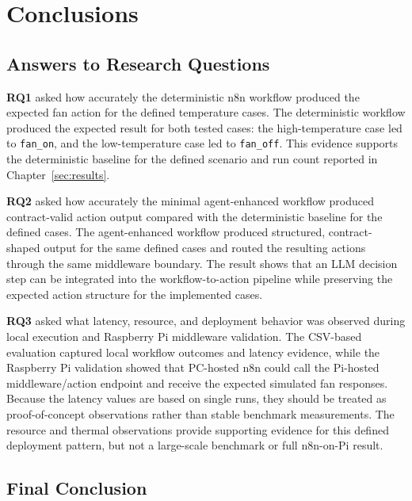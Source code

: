 \section{Conclusions}\label{sec:conclusions}

\subsection{Answers to Research Questions}\label{subsec:conclusion-research-questions}

\textbf{RQ1} asked how accurately the deterministic n8n workflow produced the expected fan action for the defined temperature cases. The deterministic workflow produced the expected result for both tested cases: the high-temperature case led to \texttt{fan\_on}, and the low-temperature case led to \texttt{fan\_off}. This evidence supports the deterministic baseline for the defined scenario and run count reported in Chapter~\ref{sec:results}.

\textbf{RQ2} asked how accurately the minimal agent-enhanced workflow produced contract-valid action output compared with the deterministic baseline for the defined cases. The agent-enhanced workflow produced structured, contract-shaped output for the same defined cases and routed the resulting actions through the same middleware boundary. The result shows that an LLM decision step can be integrated into the workflow-to-action pipeline while preserving the expected action structure for the implemented cases.


\textbf{RQ3} asked what latency, resource, and deployment behavior was observed during local execution and Raspberry Pi middleware validation. The CSV-based evaluation captured local workflow outcomes and latency evidence, while the Raspberry Pi validation showed that PC-hosted n8n could call the Pi-hosted middleware/action endpoint and receive the expected simulated fan responses. Because the latency values are based on single runs, they should be treated as proof-of-concept observations rather than stable benchmark measurements. The resource and thermal observations provide supporting evidence for this defined deployment pattern, but not a large-scale benchmark or full n8n-on-Pi result.

\subsection{Final Conclusion}\label{subsec:final-conclusion}


